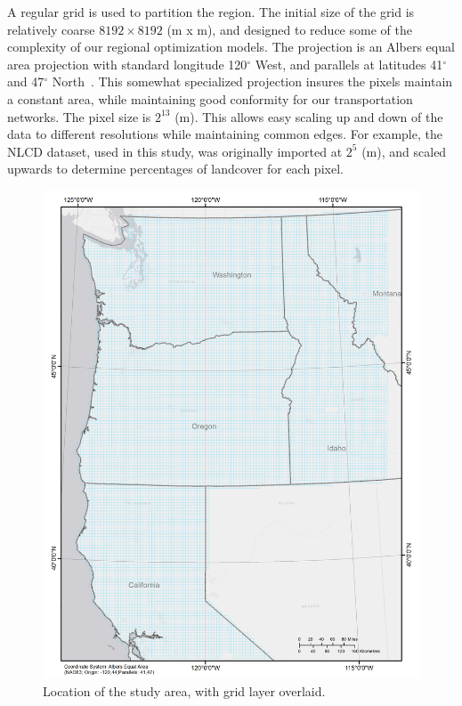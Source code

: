 \documentclass[preprint,12pt]{elsarticle}
\newcommand{\degree}{\ensuremath{{}^{\circ}}\xspace}
\begin{document}
A regular grid is used to partition the region.  The initial size of
the grid is relatively coarse $8192 \times 8192$ (m x m), and designed
to reduce some of the complexity of our regional optimization models.
The projection is an Albers equal area projection with standard
longitude 120\degree West, and parallels at latitudes 41\degree and
47\degree North~\cite{Butler}. This somewhat specialized projection
insures the pixels maintain a constant area, while maintaining good
conformity for our transportation networks.  The pixel size is
$2^{13}$ (m).  This allows easy scaling up and down of the data to
different resolutions while maintaining common edges.  For example,
the \ac{NLCD} dataset, used in this study, was originally imported at
$2^5$ (m), and scaled upwards to determine percentages of landcover
for each pixel.

\begin{figure}[hp]
  \centering
  \includegraphics[width=1.0\linewidth]{grid}
  \caption{Location of the study area, with grid layer overlaid.}
  \label{fig:grid}
\end{figure}
\end{document}
